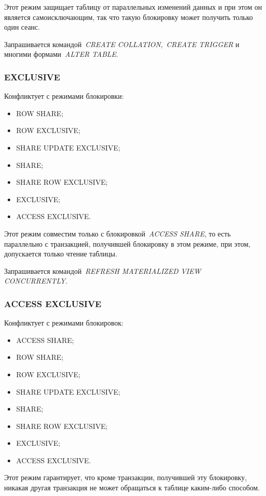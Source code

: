 Этот режим защищает таблицу от параллельных изменений данных и при этом он является самоисключающим, так что такую блокировку может получить только один сеанс.

Запрашивается командой~\textit{CREATE COLLATION},~\textit{CREATE TRIGGER} и многими формами~\textit{ALTER TABLE}.

\subsubsection*{EXCLUSIVE}

Конфликтует с режимами блокировки:

\begin{itemize}
	\item ROW SHARE;
	\item ROW  EXCLUSIVE;
	\item SHARE UPDATE EXCLUSIVE;
	\item SHARE;
	\item SHARE ROW EXCLUSIVE;
	\item EXCLUSIVE;
	\item ACCESS EXCLUSIVE.
\end{itemize}

Этот режим совместим только с блокировкой~\textit{ACCESS SHARE}, то есть параллельно с транзакцией, получившей блокировку в этом режиме, при этом, допускается только чтение таблицы.

Запрашивается командой~\textit{REFRESH MATERIALIZED VIEW\\CONCURRENTLY}.

\subsubsection*{ACCESS EXCLUSIVE}

Конфликтует с режимами блокировок:

\begin{itemize}
	\item ACCESS SHARE;
	\item ROW SHARE;
	\item ROW  EXCLUSIVE;
	\item SHARE UPDATE EXCLUSIVE;
	\item SHARE;
	\item SHARE ROW EXCLUSIVE;
	\item EXCLUSIVE;
	\item ACCESS EXCLUSIVE.
\end{itemize}

Этот режим гарантирует, что кроме транзакции, получившей эту блокировку, никакая другая транзакция не может обращаться к таблице каким-либо способом.

